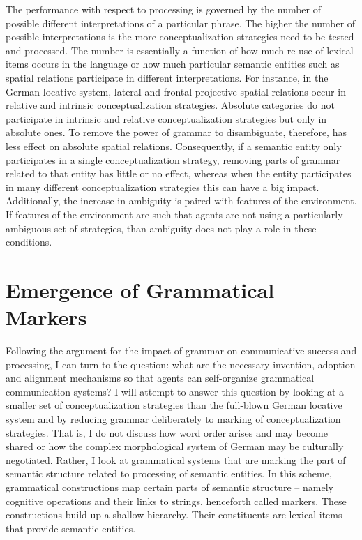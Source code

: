 The performance with respect to processing is governed by the number of
possible different interpretations of a particular phrase. The higher the number of 
possible interpretations is the more conceptualization strategies need to be tested 
and processed. The number is essentially a function of how much re-use of 
lexical items occurs in the language or how much particular semantic entities 
such as spatial relations participate in different interpretations.
For instance, in the German locative system, lateral and frontal projective 
spatial relations occur in relative and intrinsic conceptualization strategies. 
Absolute categories do not participate in intrinsic and relative conceptualization 
strategies but only in absolute ones. To remove the power 
of grammar to disambiguate, therefore, has less effect on absolute spatial 
relations. Consequently, if a semantic entity only participates
in a single conceptualization strategy, removing parts of grammar related 
to that entity has little or no effect, whereas when the entity participates 
in many different conceptualization 
strategies this can have a big impact. Additionally, the increase in ambiguity is paired
with features of the environment. If features of the environment are such that agents 
are not using a particularly ambiguous set of strategies, than ambiguity 
does not play a role in these conditions.


\section{Emergence of Grammatical Markers}
Following the argument for the impact of grammar on communicative success 
and processing, I can turn to the question: what are the necessary 
invention, adoption and alignment mechanisms so that agents can self-organize grammatical communication systems? 
I will attempt to answer this question by looking at a smaller set of conceptualization strategies than the full-blown
German locative system and by reducing grammar deliberately to marking of conceptualization strategies. 
That is, I do not discuss how word order arises and may become shared or how the complex morphological system of German 
may be culturally negotiated. Rather, I look at grammatical systems that are 
marking the part of semantic structure related to processing of semantic entities. 
In this scheme, grammatical constructions map certain parts of semantic structure 
-- namely cognitive operations and their links to strings, henceforth called markers.
These constructions build up a shallow hierarchy. Their constituents are
 lexical items that provide semantic entities.

